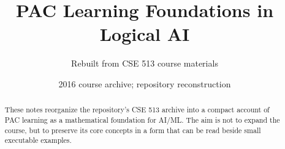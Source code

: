 \documentclass[11pt]{article}
\title{PAC Learning Foundations in Logical AI}
\author{Rebuilt from CSE 513 course materials}
\date{2016 course archive; repository reconstruction}
\begin{document}
\maketitle

\begin{abstract}
These notes reorganize the repository's CSE 513 archive into a compact account
of PAC learning as a mathematical foundation for AI/ML. The aim is not to expand
the course, but to preserve its core concepts in a form that can be read beside
small executable examples.
\end{abstract}

\tableofcontents






\end{document}
